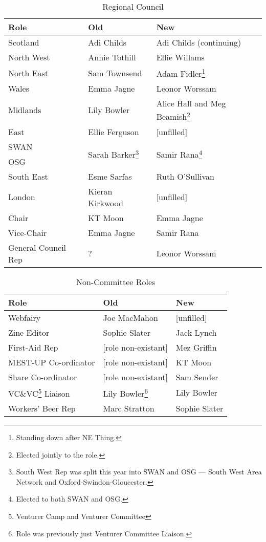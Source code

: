 \documentclass[a4paper, 12pt]{article}
\begin{document}
\begin{savenotes}
\begin{table}[H]
\centering

\begin{tabular}{ l || l | l }
\textbf{Role}		& \textbf{Old}		& \textbf{New} \\ \hline
Scotland			& Adi Childs		& Adi Childs (continuing) \\
North West			& Annie Tothill		& Ellie Willams \\
North East			& Sam Townsend		& Adam Fidler\footnote{Standing down after NE Thing.} \\
Wales				& Emma Jagne		& Leonor Worssam \\
Midlands			& Lily Bowler		& Alice Hall and Meg Beamish\footnote{Elected jointly to the role.} \\
East				& Ellie Ferguson	& [unfilled] \\
SWAN				& \multirow{2}{*}{Sarah Barker\footnote{South West Rep was split this year into SWAN and OSG --- South West Area Network and Oxford-Swindon-Gloucester.}} & \multirow{2}{*}{Samir Rana\footnote{Elected to both SWAN and OSG.}} \\
OSG					& 					&  \\
South East			& Esme Sarfas		& Ruth O'Sullivan \\
London				& Kieran Kirkwood	& [unfilled] \\
Chair				& KT Moon			& Emma Jagne \\
Vice-Chair			& Emma Jagne		& Samir Rana \\
General Council Rep	& ?					& Leonor Worssam \\
\end{tabular}
\caption{Regional Council}
\label{tab:council}
\end{table}
\end{savenotes}

\begin{savenotes}
\begin{table}[H]
\centering

\begin{tabular}{ l || l | l }
\textbf{Role}			& \textbf{Old}			& \textbf{New} \\ \hline
Webfairy				& Joe MacMahon			& [unfilled] \\
Zine Editor				& Sophie Slater			& Jack Lynch \\
First-Aid Rep			& [role non-existant]	& Mez Griffin \\
MEST-UP Co-ordinator	& [role non-existant]	& KT Moon \\
Share Co-ordinator		& [role non-existant]	& Sam Sender \\
VC\&VC\footnote{Venturer Camp and Venturer Committee} Liaison	& Lily Bowler\footnote{Role was previously just Venturer Committee Liaison.}	& Lily Bowler \\
Workers' Beer Rep		& Marc Stratton			& Sophie Slater \\
\end{tabular}
\caption{Non-Committee Roles}
\label{tab:nonctte}
\end{table}
\end{savenotes}
\end{document}
